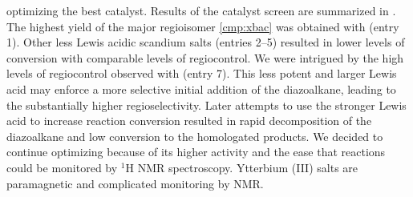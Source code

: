 optimizing the best catalyst. Results of the catalyst screen are summarized in
. The highest yield of the major regioisomer
\ref{cmp:xbac} was obtained with  (entry 1). Other less
Lewis acidic scandium salts (entries 2--5) resulted in lower levels of
conversion with comparable levels of regiocontrol. We were intrigued by the high
levels of regiocontrol observed with  (entry 7). This less potent
and larger Lewis acid may enforce a more selective initial addition of the
diazoalkane, leading to the substantially higher regioselectivity. Later
attempts to use the stronger Lewis acid  to increase reaction
conversion resulted in rapid decomposition of the diazoalkane and low
conversion to the homologated products. We decided to continue optimizing
 because of its higher activity and the ease that reactions could
be monitored by $^1$H NMR spectroscopy. Ytterbium (III) salts are paramagnetic
and complicated monitoring by NMR. 
